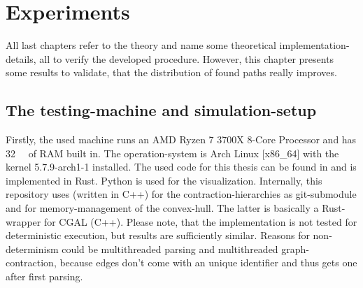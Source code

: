 \chapter{Experiments}
\label{chap:experiments}

All last chapters refer to the theory and name some theoretical implementation-details, all to verify the developed procedure.
However, this chapter presents some results to validate, that the distribution of found paths really improves.

\section{The testing-machine and simulation-setup}

    Firstly, the used machine runs an AMD Ryzen 7 3700X 8-Core Processor and has \si{\num{32} \giga\byte} of RAM built in.
    The operation-system is Arch Linux [x86\_64] with the kernel 5.7.9-arch1-1 installed.
    The used code for this thesis can be found in \cite{github:dominicparga/osmgraphing} and is implemented in Rust.
    Python is used for the visualization.
    Internally, this repository uses \cite{github:lesstat/multi-ch-constructor} (written in C++) for the \gls{contraction-hierarchies} as git-submodule and \cite{github:lesstat/nd-triangulation} for memory-management of the convex-hull.
    The latter is basically a Rust-wrapper for CGAL (C++).
    Please note, that the implementation is not tested for deterministic execution, but results are sufficiently similar.
    Reasons for non-determinism could be multithreaded parsing and multithreaded graph-contraction, because edges don't come with an unique identifier and thus gets one after first parsing.


